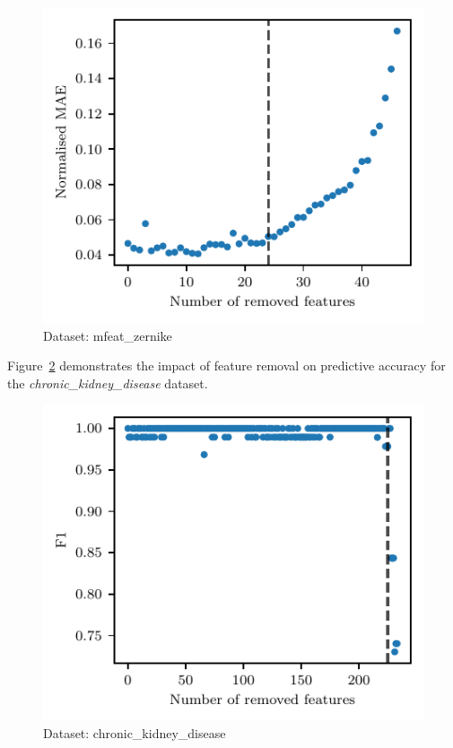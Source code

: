 \documentclass[3p,review,authoryear]{elsarticle}
\begin{document}
\begin{figure}[h!]
    \centering
    \includegraphics{loss_mfeat.pdf}
    \caption{Dataset: mfeat\_zernike}
    \label{fig:loss_mfeat}
\end{figure}

Figure~\ref{fig:loss_chronic} demonstrates the impact of feature removal on predictive accuracy for the \textit{chronic\_kidney\_disease} dataset.

\begin{figure}[h!]
    \centering
    \includegraphics{loss_chronic.pdf}
    \caption{Dataset: chronic\_kidney\_disease}
    \label{fig:loss_chronic}
\end{figure}
\end{document}
